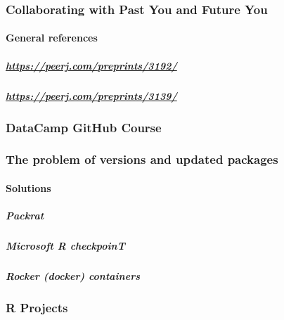 \documentclass[]{book}
\let\oldparagraph\paragraph
\renewcommand{\paragraph}[1]{\oldparagraph{#1}\mbox{}}
\let\oldsubparagraph\subparagraph
\renewcommand{\subparagraph}[1]{\oldsubparagraph{#1}\mbox{}}
\theoremstyle{definition}
\theoremstyle{definition}
\theoremstyle{definition}
\theoremstyle{remark}
\begin{document}
\hypertarget{collaborating-with-past-you-and-future-you}{%
\subsubsection{Collaborating with Past You and Future
You}\label{collaborating-with-past-you-and-future-you}}

\hypertarget{general-references}{%
\paragraph{General references}\label{general-references}}

\hypertarget{httpspeerj.compreprints3192}{%
\subparagraph{\texorpdfstring{\url{https://peerj.com/preprints/3192/}}{https://peerj.com/preprints/3192/}}\label{httpspeerj.compreprints3192}}

\hypertarget{httpspeerj.compreprints3139}{%
\subparagraph{\texorpdfstring{\url{https://peerj.com/preprints/3139/}}{https://peerj.com/preprints/3139/}}\label{httpspeerj.compreprints3139}}

\hypertarget{datacamp-github-course}{%
\subsubsection{DataCamp GitHub Course}\label{datacamp-github-course}}

\hypertarget{the-problem-of-versions-and-updated-packages}{%
\subsubsection{The problem of versions and updated
packages}\label{the-problem-of-versions-and-updated-packages}}

\hypertarget{solutions}{%
\paragraph{Solutions}\label{solutions}}

\hypertarget{packrat}{%
\subparagraph{Packrat}\label{packrat}}

\hypertarget{microsoft-r-checkpoint}{%
\subparagraph{Microsoft R checkpoinT}\label{microsoft-r-checkpoint}}

\hypertarget{rocker-docker-containers}{%
\subparagraph{Rocker (docker)
containers}\label{rocker-docker-containers}}

\hypertarget{r-projects}{%
\subsubsection{R Projects}\label{r-projects}}
\end{document}
